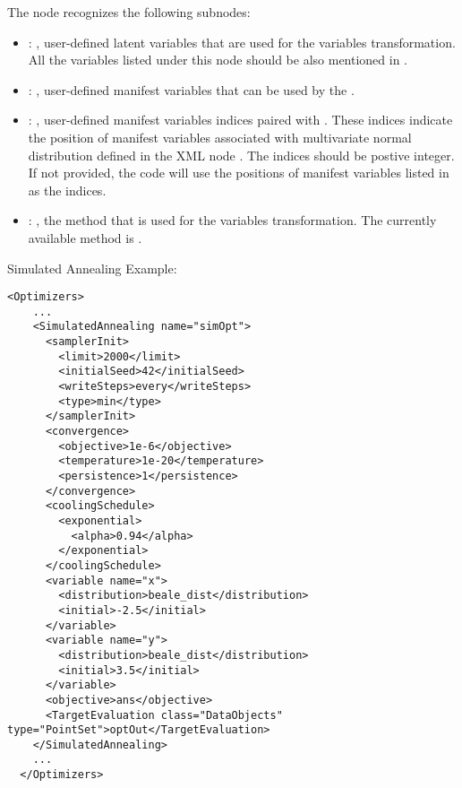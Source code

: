 \begin{itemize}
      The  node recognizes the following subnodes:
      \begin{itemize}
        \item {}: ,
          user-defined latent variables that are used for the variables transformation.
          All the variables listed under this node should be also mentioned in .

        \item {}: ,
          user-defined manifest variables that can be used by the .

        \item {}: ,
          user-defined manifest variables indices paired with .
          These indices indicate the position of manifest variables associated with multivariate
          normal               distribution defined in the XML node .
          The indices should be postive integer. If not provided, the code will use the positions
          of manifest variables listed in  as the indices.

        \item {}: ,
          the method that is used for the variables transformation. The currently available method
          is .
      \end{itemize}
  \end{itemize}

\hspace{24pt}
Simulated Annealing Example:
\begin{lstlisting}[style=XML]
  <Optimizers>
    ...
    <SimulatedAnnealing name="simOpt">
      <samplerInit>
        <limit>2000</limit>
        <initialSeed>42</initialSeed>
        <writeSteps>every</writeSteps>
        <type>min</type>
      </samplerInit>
      <convergence>
        <objective>1e-6</objective>
        <temperature>1e-20</temperature>
        <persistence>1</persistence>
      </convergence>
      <coolingSchedule>
        <exponential>
          <alpha>0.94</alpha>
        </exponential>
      </coolingSchedule>
      <variable name="x">
        <distribution>beale_dist</distribution>
        <initial>-2.5</initial>
      </variable>
      <variable name="y">
        <distribution>beale_dist</distribution>
        <initial>3.5</initial>
      </variable>
      <objective>ans</objective>
      <TargetEvaluation class="DataObjects" type="PointSet">optOut</TargetEvaluation>
    </SimulatedAnnealing>
    ...
  </Optimizers>
\end{lstlisting}



